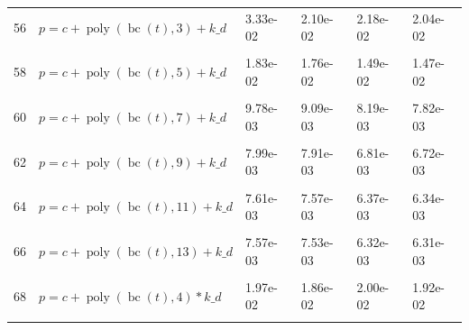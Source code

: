\documentclass[12pt,a4paper]{article}
\DeclareMathOperator{\bc}{bc}
\DeclareMathOperator{\poly}{poly}
\begin{document}
\begin{longtable}[t]{ll>{\raggedleft\arraybackslash}p{2cm}>{\raggedleft\arraybackslash}p{2cm}>{\raggedleft\arraybackslash}p{2cm}>{\raggedleft\arraybackslash}p{2cm}}
56 & $p = c + \poly\left( \bc(t), 3 \right) + k\_d$ & 3.33e-02 & 2.10e-02 & 2.18e-02 & 2.04e-02\\
\cellcolor{gray!6}{57} & \cellcolor{gray!6}{$p = c + \poly\left( \bc(t), 4 \right) + k\_d$} & \cellcolor{gray!6}{2.10e-02} & \cellcolor{gray!6}{1.99e-02} & \cellcolor{gray!6}{2.07e-02} & \cellcolor{gray!6}{2.01e-02}\\
58 & $p = c + \poly\left( \bc(t), 5 \right) + k\_d$ & 1.83e-02 & 1.76e-02 & 1.49e-02 & 1.47e-02\\
\cellcolor{gray!6}{59} & \cellcolor{gray!6}{$p = c + \poly\left( \bc(t), 6 \right) + k\_d$} & \cellcolor{gray!6}{1.00e-02} & \cellcolor{gray!6}{9.38e-03} & \cellcolor{gray!6}{9.00e-03} & \cellcolor{gray!6}{8.32e-03}\\
60 & $p = c + \poly\left( \bc(t), 7 \right) + k\_d$ & 9.78e-03 & 9.09e-03 & 8.19e-03 & 7.82e-03\\
\cellcolor{gray!6}{61} & \cellcolor{gray!6}{$p = c + \poly\left( \bc(t), 8 \right) + k\_d$} & \cellcolor{gray!6}{8.66e-03} & \cellcolor{gray!6}{8.32e-03} & \cellcolor{gray!6}{6.92e-03} & \cellcolor{gray!6}{6.88e-03}\\
62 & $p = c + \poly\left( \bc(t), 9 \right) + k\_d$ & 7.99e-03 & 7.91e-03 & 6.81e-03 & 6.72e-03\\
\cellcolor{gray!6}{63} & \cellcolor{gray!6}{$p = c + \poly\left( \bc(t), 10 \right) + k\_d$} & \cellcolor{gray!6}{7.69e-03} & \cellcolor{gray!6}{7.65e-03} & \cellcolor{gray!6}{6.38e-03} & \cellcolor{gray!6}{6.37e-03}\\
64 & $p = c + \poly\left( \bc(t), 11 \right) + k\_d$ & 7.61e-03 & 7.57e-03 & 6.37e-03 & 6.34e-03\\
\cellcolor{gray!6}{65} & \cellcolor{gray!6}{$p = c + \poly\left( \bc(t), 12 \right) + k\_d$} & \cellcolor{gray!6}{7.59e-03} & \cellcolor{gray!6}{7.55e-03} & \cellcolor{gray!6}{6.33e-03} & \cellcolor{gray!6}{6.32e-03}\\
66 & $p = c + \poly\left( \bc(t), 13 \right) + k\_d$ & 7.57e-03 & 7.53e-03 & 6.32e-03 & 6.31e-03\\
\cellcolor{gray!6}{67} & \cellcolor{gray!6}{$p = c + \poly\left( \bc(t), 3 \right) * k\_d$} & \cellcolor{gray!6}{3.25e-02} & \cellcolor{gray!6}{1.98e-02} & \cellcolor{gray!6}{2.11e-02} & \cellcolor{gray!6}{1.95e-02}\\
68 & $p = c + \poly\left( \bc(t), 4 \right) * k\_d$ & 1.97e-02 & 1.86e-02 & 2.00e-02 & 1.92e-02\\
\cellcolor{gray!6}{69} & \cellcolor{gray!6}{$p = c + \poly\left( \bc(t), 5 \right) * k\_d$} & \cellcolor{gray!6}{1.64e-02} & \cellcolor{gray!6}{1.58e-02} & \cellcolor{gray!6}{1.34e-02} & \cellcolor{gray!6}{1.31e-02}\\

\end{longtable}
\end{document}
